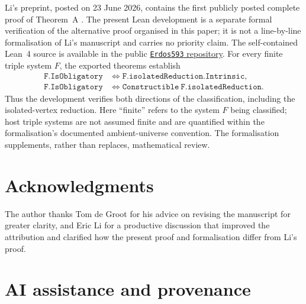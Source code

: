 \documentclass[a4paper,11pt,reqno]{amsart}
\theoremstyle{plain}
\theoremstyle{definition}
\theoremstyle{remark}
\begin{document}
Li's preprint, posted on 23 June 2026, contains the first publicly posted
complete proof of Theorem~A \citep[Theorem~1.1]{li2026}.  The present Lean
development is a separate formal verification of the alternative proof
organised in this paper; it is not a line-by-line formalisation of Li's
manuscript and carries no priority claim.  The
self-contained Lean~4 source is available in the public
\href{https://github.com/SamPetkov/Erdos593/blob/main/formalization/Erdos593SelfContained.lean}{\texttt{Erdos593} repository}.
For every finite triple system $F$, the exported theorems establish
\[
\begin{aligned}
\mathtt{F.IsObligatory}
&\Longleftrightarrow \mathtt{F.isolatedReduction.Intrinsic},\\
\mathtt{F.IsObligatory}
&\Longleftrightarrow \mathtt{Constructible\ F.isolatedReduction}.
\end{aligned}
\]
Thus the development verifies both directions of the classification,
including the isolated-vertex reduction.  Here ``finite'' refers to the
system $F$ being classified; host triple systems are not assumed finite and
are quantified within the formalisation's documented ambient-universe
convention.  The formalisation supplements, rather than replaces,
mathematical review.

\section*{Acknowledgments}

The author thanks Tom de Groot for his advice on revising the manuscript for
greater clarity, and Eric Li for a productive discussion that improved the
attribution and clarified how the present proof and formalisation differ from
Li's proof.

\section*{AI assistance and provenance}
\end{document}
